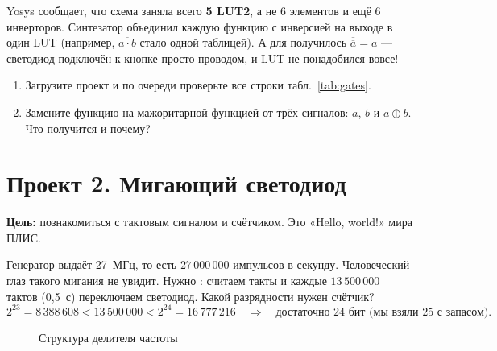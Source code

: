 \begin{infobox}
Yosys сообщает, что схема заняла всего \textbf{5 LUT2}, а не 6 элементов
и ещё 6 инверторов. Синтезатор объединил каждую функцию с инверсией на выходе в
один LUT (например, $\overline{a\cdot b}$ стало одной таблицей). А для
 получилось $\overline{\overline{a}} = a$ --- светодиод подключён
к кнопке просто проводом, и LUT не понадобился вовсе!
\end{infobox}

\begin{taskbox}
\begin{enumerate}
  \item Загрузите проект и по очереди проверьте все строки
        табл.~\ref{tab:gates}.
  \item Замените функцию на  мажоритарной функцией от трёх
        сигналов: $a$, $b$ и $a \oplus b$. Что получится и почему?
\end{enumerate}
\end{taskbox}

\section{Проект 2. Мигающий светодиод}

\textbf{Цель:} познакомиться с тактовым сигналом и счётчиком. Это
«Hello, world!» мира ПЛИС.

Генератор выдаёт \SI{27}{МГц}, то есть $27\,000\,000$ импульсов в секунду.
Человеческий глаз такого мигания не увидит. Нужно :
считаем такты и каждые $13\,500\,000$ тактов (0,5~с) переключаем
светодиод. Какой разрядности нужен счётчик?
\[
  2^{23} = 8\,388\,608 < 13\,500\,000 < 2^{24} = 16\,777\,216
  \quad\Rightarrow\quad \text{достаточно 24 бит (мы взяли 25 с запасом).}
\]

\begin{figure}[H]
\centering
{}
\caption{Структура делителя частоты}
\end{figure}

